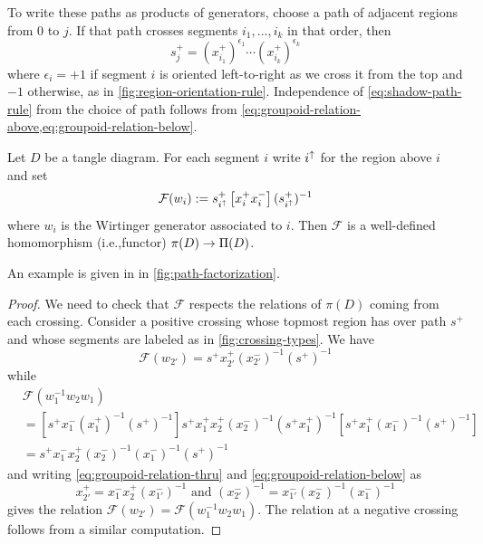 \documentclass[leqno]{sl2art}
\begin{document}
To write these paths as products of generators, choose a path of adjacent regions from \(0\) to \(j\).
If that path crosses segments \(i_1, \dots, i_k\) in that order, then
\begin{equation}
  \label{eq:shadow-path-rule}
  s_j^+ = \left(x_{i_1}^+\right)^{\epsilon_1} \cdots \left(x_{i_k}^+\right)^{\epsilon_k}
\end{equation}
where \(\epsilon_i = + 1\) if segment \(i\) is oriented left-to-right as we cross it from the top and \(-1\) otherwise, as in \cref{fig:region-orientation-rule}.
Independence of \cref{eq:shadow-path-rule} from the choice of path follows from \cref{eq:groupoid-relation-above,eq:groupoid-relation-below}.


\begin{theorem}
  \label{thm:functor}
  Let \(D\) be a tangle diagram.
  For each segment \(i\) write \(i^{\uparrow}\) for the region above \(i\) and set
  \[
    \mathcal{F}(w_i) \mathrel{:=} s^+_{i^{\uparrow}} \left[x_i^{+} x_i^{-} \right] (s_{i^{\uparrow}}^+)^{-1} 
  \]
  where \(w_i\) is the Wirtinger generator associated to \(i\).
  Then \(\mathcal{F}\) is a well-defined homomorphism (i.e.,\@ functor) \(\pi(D) \to \Pi\mathopen{}\left(D\right)\).
\end{theorem}

An example is given in in \cref{fig:path-factorization}.

\begin{proof}
   We need to check that \(\mathcal{F}\) respects the relations of \(\pi(D)\) coming from each crossing.
   Consider a positive crossing whose topmost region has over path \(s^+\) and whose segments are labeled as in \cref{fig:crossing-types}.
   We have
   \[
     \mathcal{F}(w_{2'})
     =
     s^+
     x_{2'}^{+}
     \left(x_{2'}^{-}\right)^{-1}
     \left(s^+\right)^{-1}
   \]
   while
   \begin{align*}
     &
     \mathcal{F}(w_{1}^{-1} w_{2} w_{1})
     \\
     &=
     \left[
     s^+
       x_1^- \left(x_1^+\right)^{-1}
     \left(s^+\right)^{-1}
     \right]
     s^+
     x_{1}^{+}
     x_2^+ \left(x_2^-\right)^{-1}
     \left(s^{+} x_1^{+}\right)^{-1}
     \left[
     s^+
       x_1^+ \left(x_1^-\right)^{-1}
     \left(s^+\right)^{-1}
     \right]
     \\
     &=
     s^+
     x_1^-
     x_2^+ \left(x_2^-\right)^{-1}
     \left(x_1^-\right)^{-1}
     \left(s^+\right)^{-1}
   \end{align*}
   and writing \eqref{eq:groupoid-relation-thru} and \eqref{eq:groupoid-relation-below} as
   \[
     x_{2'}^{+}
     =
     x_1^{-} x_2^{+} \left( x_{1'}^{-}\right)^{-1}
     \text{ and }
     \left(x_{2'}^{-}\right)^{-1}
     =
     x_{1'}^{-}
     \left( x_2^{-} \right)^{-1}
     \left( x_1^{-} \right)^{-1}
   \]
   gives the relation \(\mathcal{F}(w_{2'}) = \mathcal{F}(w_1^{-1} w_2 w_1)\).
   The relation at a negative crossing follows from a similar computation.
\end{proof}
\end{document}
